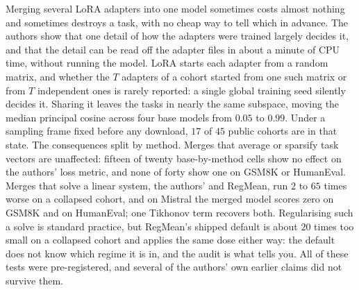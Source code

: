 Merging several LoRA adapters into one model sometimes costs almost
nothing and sometimes destroys a task, with no cheap way to tell which in
advance. The authors show that one detail of how the adapters were trained largely
decides it, and that the detail can be read off the adapter files in about
a minute of CPU time, without running the model. LoRA starts each adapter
from a random matrix, and whether the $T$ adapters of a cohort started from
one such matrix or from $T$ independent ones is rarely reported: a single
global training seed silently decides it. Sharing it leaves the tasks in
nearly the same subspace, moving the median principal cosine across four
base models from $0.05$ to $0.99$. Under a sampling frame fixed before any
download, $17$ of $45$ public cohorts are in that state. The consequences
split by method. Merges that average or sparsify task vectors are
unaffected: fifteen of twenty base-by-method cells show no effect on the authors'
loss metric, and none of forty show one on GSM8K or HumanEval. Merges that
solve a linear system, the authors' and RegMean, run $2$ to $65$ times worse on a
collapsed cohort, and on Mistral the merged model scores zero on GSM8K and
on HumanEval; one Tikhonov term recovers both. Regularising such a solve is
standard practice, but RegMean's shipped default is about $20$ times too
small on a collapsed cohort and applies the same dose either way: the
default does not know which regime it is in, and the audit is what tells
you. All of these tests were pre-registered, and several of the authors' own earlier
claims did not survive them.
